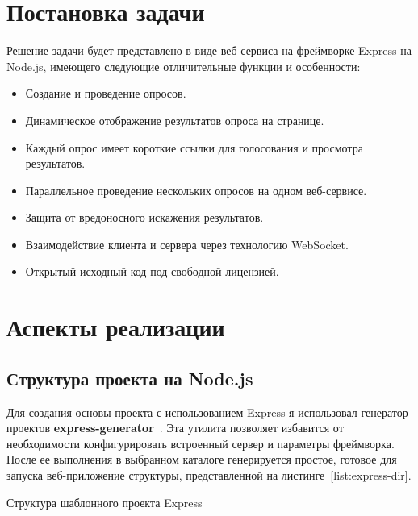 \section{Постановка задачи}
Решение задачи будет представлено в виде веб-сервиса на фреймворке Express на Node.js, имеющего следующие отличительные функции и особенности:
 \begin{itemize}
	\item Создание и проведение опросов. 
	\item Динамическое отображение результатов опроса на странице.
	\item Каждый опрос имеет короткие ссылки для голосования и просмотра результатов.
	\item Параллельное проведение нескольких опросов на одном веб-сервисе.
	\item Защита от вредоносного искажения результатов. 
	\item Взаимодействие клиента и сервера через технологию WebSocket.
	\item Открытый исходный код под свободной лицензией.
\end{itemize} 
 
\section{Аспекты реализации}
\subsection{Структура проекта на Node.js}
\label{subsec:project_structuture}
Для создания основы проекта с использованием Express я использовал генератор проектов \textbf{express-generator}~\autocite{npm}. Эта утилита позволяет избавится от необходимости конфигурировать встроенный сервер и параметры фреймворка. После ее выполнения в выбранном каталоге генерируется простое, готовое для запуска веб-приложение структуры, представленной на листинге~\ref{list:express-dir}.
\begin{ListingEnv}
\caption{Структура шаблонного проекта Express}
\label{list:express-dir}   
\end{ListingEnv}

